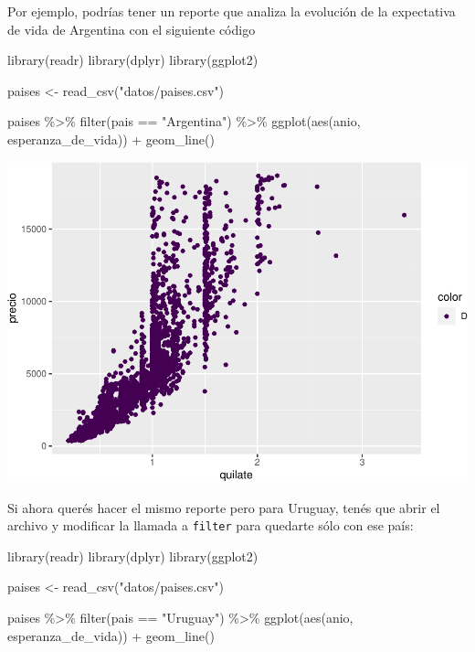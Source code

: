 \documentclass[
  openany]{book}
\newenvironment{Shaded}{\begin{snugshade}}{\end{snugshade}}
\newcommand{\FunctionTok}[1]{\textcolor[rgb]{0.00,0.00,0.00}{#1}}
\newcommand{\NormalTok}[1]{#1}
\newcommand{\OtherTok}[1]{\textcolor[rgb]{0.56,0.35,0.01}{#1}}
\newcommand{\SpecialCharTok}[1]{\textcolor[rgb]{0.00,0.00,0.00}{#1}}
\newcommand{\StringTok}[1]{\textcolor[rgb]{0.31,0.60,0.02}{#1}}
\begin{document}
Por ejemplo, podrías tener un reporte que analiza la evolución de la expectativa de vida de Argentina con el siguiente código

\begin{Shaded}
\begin{Highlighting}[]
\FunctionTok{library}\NormalTok{(readr)}
\FunctionTok{library}\NormalTok{(dplyr)}
\FunctionTok{library}\NormalTok{(ggplot2)}

\NormalTok{paises }\OtherTok{\textless{}{-}} \FunctionTok{read\_csv}\NormalTok{(}\StringTok{"datos/paises.csv"}\NormalTok{)}

\NormalTok{paises }\SpecialCharTok{\%\textgreater{}\%} 
  \FunctionTok{filter}\NormalTok{(pais }\SpecialCharTok{==} \StringTok{"Argentina"}\NormalTok{) }\SpecialCharTok{\%\textgreater{}\%} 
  \FunctionTok{ggplot}\NormalTok{(}\FunctionTok{aes}\NormalTok{(anio, esperanza\_de\_vida)) }\SpecialCharTok{+}
  \FunctionTok{geom\_line}\NormalTok{()}
\end{Highlighting}
\end{Shaded}

\begin{center}\includegraphics[width=1\linewidth]{DT6_files/figure-latex/unnamed-chunk-72-1} \end{center}

Si ahora querés hacer el mismo reporte pero para Uruguay, tenés que abrir el archivo y modificar la llamada a \texttt{filter} para quedarte sólo con ese país:

\begin{Shaded}
\begin{Highlighting}[]
\FunctionTok{library}\NormalTok{(readr)}
\FunctionTok{library}\NormalTok{(dplyr)}
\FunctionTok{library}\NormalTok{(ggplot2)}

\NormalTok{paises }\OtherTok{\textless{}{-}} \FunctionTok{read\_csv}\NormalTok{(}\StringTok{"datos/paises.csv"}\NormalTok{)}

\NormalTok{paises }\SpecialCharTok{\%\textgreater{}\%} 
  \FunctionTok{filter}\NormalTok{(pais }\SpecialCharTok{==} \StringTok{"Uruguay"}\NormalTok{) }\SpecialCharTok{\%\textgreater{}\%} 
  \FunctionTok{ggplot}\NormalTok{(}\FunctionTok{aes}\NormalTok{(anio, esperanza\_de\_vida)) }\SpecialCharTok{+}
  \FunctionTok{geom\_line}\NormalTok{()}
\end{Highlighting}
\end{Shaded}
\end{document}
